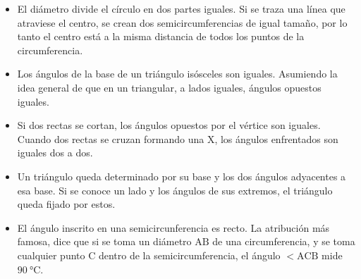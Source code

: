 \documentclass[a4paper,12pt]{article} %
\begin{document}
\begin{justify}
	\begin{itemize}
		\item El diámetro divide el círculo en dos partes iguales. Si se traza una línea que atraviese el centro, se
		crean dos semicircumferencias de igual tamaño, por lo tanto el centro está a la misma distancia de
		todos los puntos de la circumferencia.

		\item Los ángulos de la base de un triángulo isósceles son iguales. Asumiendo la idea general de que en
		un triangular, a lados iguales, ángulos opuestos iguales.

		\item  Si dos rectas se cortan, los ángulos opuestos por el vértice son iguales. Cuando dos rectas se
		cruzan formando una \(\mathrm{X}\), los ángulos enfrentados son iguales dos a dos.

		\item Un triángulo queda determinado por su base y los dos ángulos adyacentes a esa base. Si se conoce
		un lado y los ángulos de sus extremos, el triángulo queda fijado por estos.

		\item El ángulo inscrito en una semicircunferencia es recto. La atribución más famosa, dice que si se
		toma un diámetro \(\mathrm{AB}\) de una circumferencia, y se toma cualquier punto \(\mathrm{C}\) dentro de la
		semicircumferencia, el ángulo \(<\mathrm{ACB}\) mide \(\SI{90}{\degreeCelsius}\).
	\end{itemize}
\end{justify}
\end{document}
